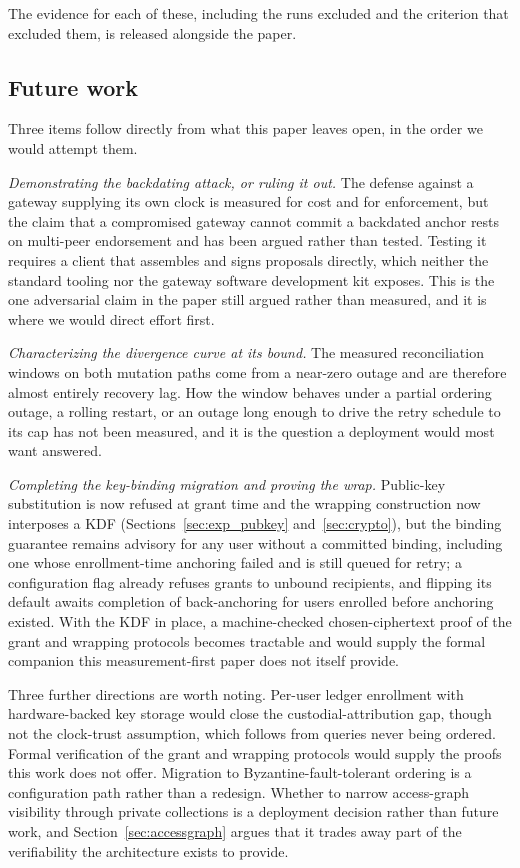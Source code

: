 \documentclass[preprint,12pt]{elsarticle}
\begin{document}
The evidence for each of these, including the runs excluded and the criterion
that excluded them, is released alongside the paper.

\subsection*{Future work}

Three items follow directly from what this paper leaves open, in the order we
would attempt them.

\emph{Demonstrating the backdating attack, or ruling it out.} The defense
against a gateway supplying its own clock is measured for cost and for
enforcement, but the claim that a compromised gateway cannot commit a
backdated anchor rests on multi-peer endorsement and has been argued rather
than tested. Testing it requires a client that assembles and signs proposals
directly, which neither the standard tooling nor the gateway software
development kit exposes. This is the one adversarial claim in the paper still
argued rather than measured, and it is where we would direct effort first.

\emph{Characterizing the divergence curve at its bound.} The measured
reconciliation windows on both mutation paths come from a near-zero outage and
are therefore almost entirely recovery lag. How the window behaves under a
partial ordering outage, a rolling restart, or an outage long enough to drive
the retry schedule to its cap has not been measured, and it is the question a
deployment would most want answered.

\emph{Completing the key-binding migration and proving the wrap.}
Public-key substitution is now refused at grant time and the wrapping
construction now interposes a KDF (Sections~\ref{sec:exp_pubkey}
and~\ref{sec:crypto}), but the binding guarantee remains advisory for any user without a
committed binding, including one whose enrollment-time anchoring failed and is
still queued for retry; a configuration flag already refuses grants to unbound
recipients, and flipping its default awaits completion of back-anchoring for
users enrolled before anchoring existed. With the KDF in place,
a machine-checked chosen-ciphertext proof of the grant and wrapping protocols
becomes tractable and would supply the formal companion this
measurement-first paper does not itself provide.

Three further directions are worth noting. Per-user ledger enrollment with
hardware-backed key storage would close the custodial-attribution gap, though
not the clock-trust assumption, which follows from queries never being
ordered. Formal verification of the grant and wrapping protocols would supply
the proofs this work does not offer. Migration to Byzantine-fault-tolerant
ordering is a configuration path rather than a redesign. Whether to narrow
access-graph visibility through private collections is a deployment decision
rather than future work, and Section~\ref{sec:accessgraph} argues that it
trades away part of the verifiability the architecture exists to provide.
\end{document}
